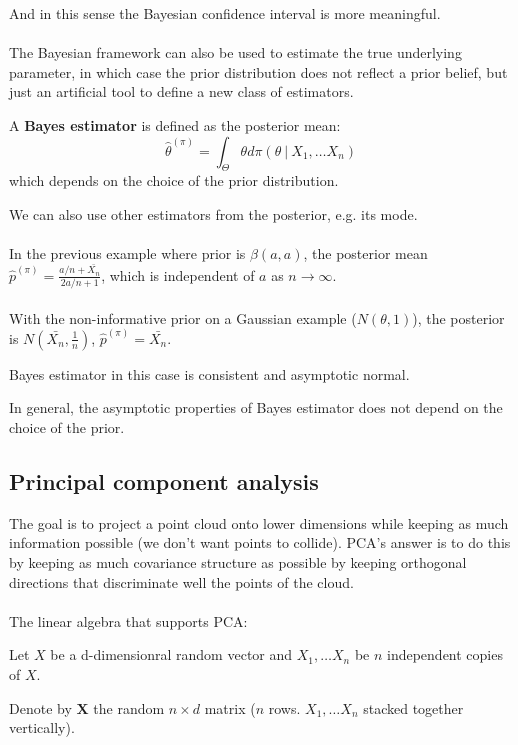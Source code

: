 \documentclass{article}
\begin{document}
And in this sense the Bayesian confidence interval is more meaningful.
\\
\\

The Bayesian framework can also be used to estimate the true underlying parameter,
in which case the prior distribution does not reflect a prior belief,
but just an artificial tool to define a new class of estimators.

A \textbf{Bayes estimator} is defined as the posterior mean:
$$
\hat{\theta}^{(\pi)} = \int_{\Theta} \theta d\pi(\theta ~ | ~ X_1, \dots X_n)
$$
which depends on the choice of the prior distribution.

We can also use other estimators from the posterior, e.g. its mode.
\\
\\
In the previous example where prior is $\beta(a, a)$,
the posterior mean $\hat{p}^{(\pi)} = \frac{a / n + \bar{X_n}}{2 a / n + 1}$,
which is independent of $a$ as $n \rightarrow \infty$.
\\
\\
With the non-informative prior on a Gaussian example ($\mathit{N}(\theta, 1)$),
the posterior is $\mathit{N}(\bar{X_n}, \frac{1}{n})$,
$\hat{p}^{(\pi)} = \bar{X_n}$.

Bayes estimator in this case is consistent and asymptotic normal.

In general,
the asymptotic properties of Bayes estimator does not depend on the choice of the prior.


\subsection{Principal component analysis}

The goal is to project a point cloud onto lower dimensions while keeping as much information possible
(we don't want points to collide).
PCA's answer is to do this by keeping as much covariance structure as possible by keeping orthogonal directions that discriminate well the points of the cloud.
\\
\\

The linear algebra that supports PCA:

Let $X$ be a d-dimensionral random vector and $X_1, \dots X_n$ be $n$ independent copies of $X$.

Denote by $\mathbf{X}$ the random $n \times d$ matrix ($n$ rows. $X_1, \dots X_n$ stacked together vertically).
\end{document}
